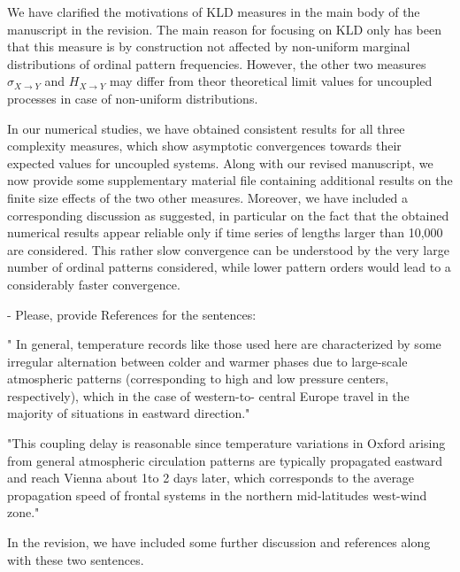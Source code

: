 \documentclass[aps,chaos,superscriptaddress,showkeys]{revtex4}
\begin{document}
\begin{center}
\begin{minipage}[c]{0.9\textwidth}
We have clarified the motivations of KLD measures in the main body of the manuscript in the revision. The main reason for focusing on KLD only has been that this measure is by construction not affected by non-uniform marginal distributions of ordinal pattern frequencies. However, the other two measures $\sigma_{X\to Y}$ and $H_{X\to Y}$ may differ from theor theoretical limit values for uncoupled processes in case of non-uniform distributions. 
\vspace{0.6cm}

In our numerical studies, we have obtained consistent results for all three complexity measures, which show asymptotic convergences towards their expected values for uncoupled systems. Along with our revised manuscript, we now provide some supplementary material file containing additional results on the finite size effects of the two other measures. Moreover, we have included a corresponding discussion as suggested, in particular on the fact that the obtained numerical results appear reliable only if time series of lengths larger than 10,000 are considered. This rather slow convergence can be understood by the very large number of ordinal patterns considered, while lower pattern orders would lead to a considerably faster convergence.
\end{minipage}
\end{center}



\noindent
{- Please, provide References for the sentences: 

" In general, temperature records like those used here are characterized by some irregular alternation between colder and warmer phases due to large-scale atmospheric patterns (corresponding to high and low pressure centers, respectively), which in the case of western-to- central Europe travel in the majority of situations in eastward direction." 


"This coupling delay is reasonable since temperature variations in Oxford arising from general atmospheric circulation patterns are typically propagated eastward and reach Vienna about 1to 2 days later, which corresponds to the average propagation speed of frontal systems in the northern mid-latitudes west-wind zone."}

\begin{center}
\begin{minipage}[c]{0.9\textwidth}
In the revision, we have included some further discussion and references along with these two sentences.
\end{minipage}
\end{center}
\end{document}
